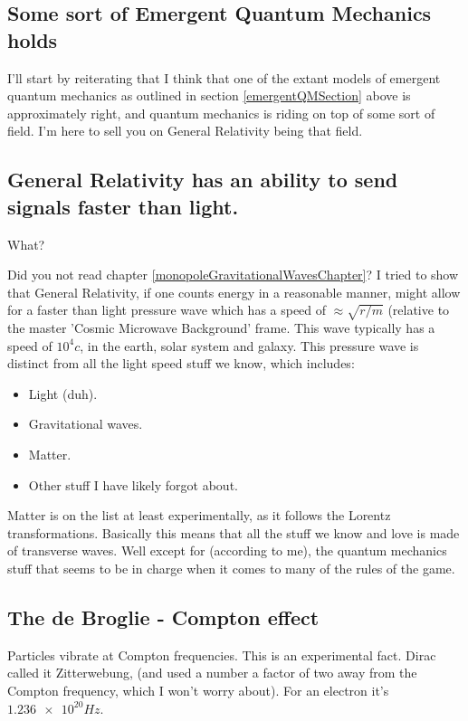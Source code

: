 \documentclass[../rzero]{subfiles}
\begin{document}
\subsection{Some sort of Emergent Quantum Mechanics holds}
I'll start by reiterating that I think that one of the extant models of emergent quantum mechanics as outlined in section \ref{emergentQMSection} above is approximately right, and quantum mechanics is riding on top of some sort of field. I'm here to sell you on General Relativity being that field. 

\subsection{General Relativity has an ability to send signals faster than light.}
What? 

Did you not read chapter \ref{monopoleGravitationalWavesChapter}? I tried to show that General Relativity, if one counts energy in a reasonable manner, might allow for a faster than light pressure wave which has a speed of $\approx \sqrt{r/m}$ (relative to the master 'Cosmic Microwave Background' frame. This wave typically has a speed of $10^4 c$, in the earth, solar system and galaxy. This pressure wave is distinct from all the light speed stuff we know, which includes:

\begin{itemize}
  \item Light (duh).
  \item Gravitational waves.
  \item Matter.
  \item Other stuff I have likely forgot about.
\end{itemize}

Matter is on the list at least experimentally, as it follows the Lorentz transformations. Basically this means that all the stuff we know and love is made of transverse waves. Well except for (according to me), the quantum mechanics stuff that seems to be in charge when it comes to many of the rules of the game. 

\subsection{The de Broglie - Compton effect}
Particles vibrate at Compton frequencies. This is an experimental fact. Dirac called it Zitterwebung, (and used a number a factor of two away from the Compton frequency, which I won't worry about). For an electron it's $\num{1.236e20} Hz$. 
\end{document}
